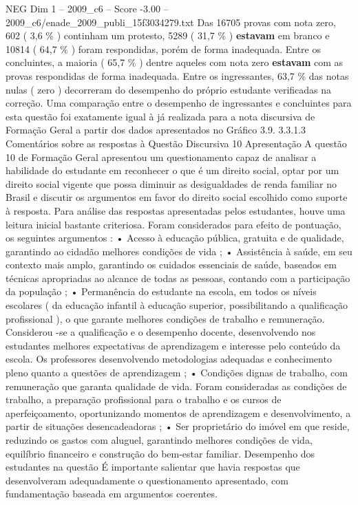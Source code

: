 \begin{textsample}{NEG Dim 1 – 2009\_c6 – Score -3.00 – 2009\_c6/enade\_2009\_publi\_15f3034279.txt}
Das 16705 provas com nota zero, 602 ( 3,6 \% ) continham um protesto, 5289 ( 31,7 \% ) \textbf{estavam} em branco e 10814 ( 64,7 \% ) foram respondidas, porém de forma inadequada.
Entre os concluintes, a maioria ( 65,7 \% ) dentre aqueles com nota zero \textbf{estavam} com as provas respondidas de forma inadequada.
Entre os ingressantes, 63,7 \% das notas nulas ( zero ) decorreram do desempenho do próprio estudante verificadas na correção.
Uma comparação entre o desempenho de ingressantes e concluintes para esta questão foi exatamente igual à já realizada para a nota discursiva de Formação Geral a partir dos dados apresentados no Gráfico 3.9. 3.3.1.3 Comentários sobre as respostas à Questão Discursiva 10 Apresentação A questão 10 de Formação Geral apresentou um questionamento capaz de analisar a habilidade do estudante em reconhecer o que é um direito social, optar por um direito social vigente que possa diminuir as desigualdades de renda familiar no Brasil e discutir os argumentos em favor do direito social escolhido como suporte à resposta.
Para análise das respostas apresentadas pelos estudantes, houve uma leitura inicial bastante criteriosa.
Foram considerados para efeito de pontuação, os seguintes argumentos : • Acesso à educação pública, gratuita e de qualidade, garantindo ao cidadão melhores condições de vida ; • Assistência à saúde, em seu contexto mais amplo, garantindo os cuidados essenciais de saúde, baseados em técnicas apropriadas ao alcance de todas as pessoas, contando com a participação da população ; • Permanência do estudante na escola, em todos os níveis escolares ( da educação infantil à educação superior, possibilitando a qualificação profissional ), o que garante melhores condições de trabalho e remuneração.
Considerou -se a qualificação e o desempenho docente, desenvolvendo nos estudantes melhores expectativas de aprendizagem e interesse pelo conteúdo da escola.
Os professores desenvolvendo metodologias adequadas e conhecimento pleno quanto a questões de aprendizagem ; • Condições dignas de trabalho, com remuneração que garanta qualidade de vida.
Foram consideradas as condições de trabalho, a preparação profissional para o trabalho e os cursos de aperfeiçoamento, oportunizando momentos de aprendizagem e desenvolvimento, a partir de situações desencadeadoras ; • Ser proprietário do imóvel em que reside, reduzindo os gastos com aluguel, garantindo melhores condições de vida, equilíbrio financeiro e construção do bem-estar familiar.
Desempenho dos estudantes na questão É importante salientar que havia respostas que desenvolveram adequadamente o questionamento apresentado, com fundamentação baseada em argumentos coerentes.

\end{textsample}
